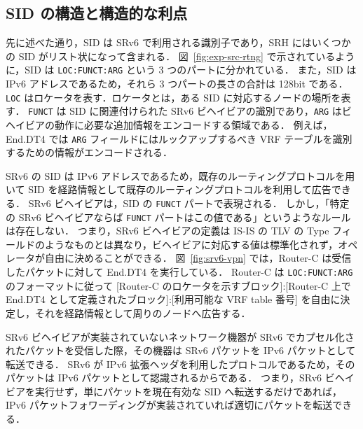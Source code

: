 \subsection*{SID の構造と構造的な利点}
\label{sbsection:srv6-sid-struct}
先に述べた通り，SID は SRv6 で利用される識別子であり，SRH にはいくつかの SID がリスト状になって含まれる．
図~\ref*{fig:exp-src-rtng} で示されているように，SID は \texttt{LOC:FUNCT:ARG} という 3 つのパートに分かれている．
また，SID は IPv6 アドレスであるため，それら 3 つパートの長さの合計は 128bit である．
\texttt{LOC} はロケータを表す．ロケータとは，ある SID に対応するノードの場所を表す．
\texttt{FUNCT} は SID に関連付けられた SRv6 ビヘイビアの識別であり，\texttt{ARG} はビヘイビアの動作に必要な追加情報をエンコードする領域である．
例えば，End.DT4 では \texttt{ARG} フィールドにはルックアップするべき VRF テーブルを識別するための情報がエンコードされる．

SRv6 の SID は IPv6 アドレスであるため，既存のルーティングプロトコルを用いて SID を経路情報として既存のルーティングプロトコルを利用して広告できる．
SRv6 ビヘイビアは，SID の \texttt{FUNCT} パートで表現される．
しかし，「特定の SRv6 ビヘイビアならば \texttt{FUNCT} パートはこの値である」というようなルールは存在しない．
つまり，SRv6 ビヘイビアの定義は IS-IS の TLV の Type フィールドのようなものとは異なり，ビヘイビアに対応する値は標準化されず，オペレータが自由に決めることができる．
図~\ref*{fig:srv6-vpn}  では，Router-C は受信したパケットに対して End.DT4 を実行している．
Router-C は \texttt{LOC:FUNCT:ARG} のフォーマットに従って [Router-C のロケータを示すブロック]:[Router-C 上で End.DT4 として定義されたブロック]:[利用可能な VRF table 番号] を自由に決定し，それを経路情報として周りのノードへ広告する．

SRv6 ビヘイビアが実装されていないネットワーク機器が SRv6 でカプセル化されたパケットを受信した際，その機器は SRv6 パケットを IPv6 パケットとして転送できる．
SRv6 が IPv6 拡張ヘッダを利用したプロトコルであるため，そのパケットは IPv6 パケットとして認識されるからである．
つまり，SRv6 ビヘイビアを実行せず，単にパケットを現在有効な SID へ転送するだけであれば，IPv6 パケットフォワーディングが実装されていれば適切にパケットを転送できる．

